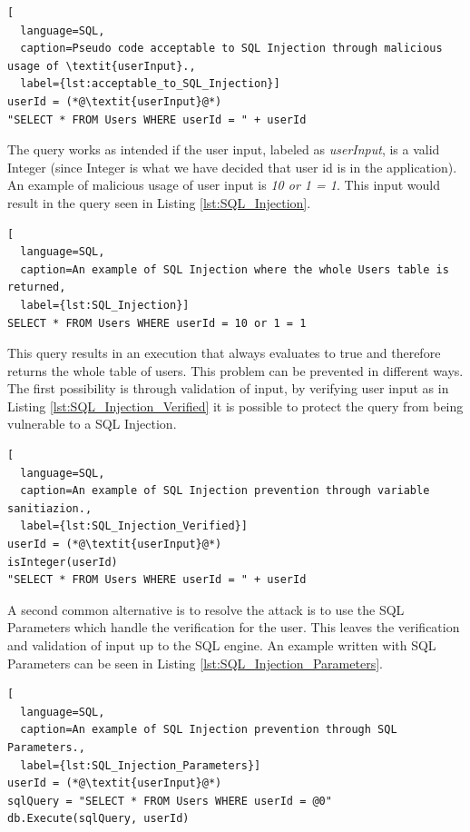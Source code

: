 \hfill
\begin{lstlisting}[
  language=SQL,
  caption=Pseudo code acceptable to SQL Injection through malicious usage of \textit{userInput}.,
  label={lst:acceptable_to_SQL_Injection}]
userId = (*@\textit{userInput}@*)
"SELECT * FROM Users WHERE userId = " + userId
\end{lstlisting}
\hfill

The query works as intended if the user input, labeled as \textit{userInput}, is a valid Integer (since Integer is what we have decided that user id is in the application). An example of malicious usage of user input is \textit{10 or 1 = 1}. This input would result in the query seen in Listing \ref{lst:SQL_Injection}.

\hfill
\begin{lstlisting}[
  language=SQL,
  caption=An example of SQL Injection where the whole Users table is returned,
  label={lst:SQL_Injection}]
SELECT * FROM Users WHERE userId = 10 or 1 = 1
\end{lstlisting}
\hfill

This query results in an execution that always evaluates to true and therefore returns the whole table of users. This problem can be prevented in different ways. The first possibility is through validation of input, by verifying user input as in Listing \ref{lst:SQL_Injection_Verified} it is possible to protect the query from being vulnerable to a SQL Injection.

\hfill
\begin{lstlisting}[
  language=SQL,
  caption=An example of SQL Injection prevention through variable sanitiazion.,
  label={lst:SQL_Injection_Verified}]
userId = (*@\textit{userInput}@*)
isInteger(userId)
"SELECT * FROM Users WHERE userId = " + userId
\end{lstlisting}
\hfill

A second common alternative is to resolve the attack is to use the SQL Parameters which handle the verification for the user. This leaves the verification and validation of input up to the SQL engine. An example written with SQL Parameters can be seen in Listing \ref{lst:SQL_Injection_Parameters}.

\hfill
\begin{lstlisting}[
  language=SQL,
  caption=An example of SQL Injection prevention through SQL Parameters.,
  label={lst:SQL_Injection_Parameters}]
userId = (*@\textit{userInput}@*)
sqlQuery = "SELECT * FROM Users WHERE userId = @0"
db.Execute(sqlQuery, userId)
\end{lstlisting}



